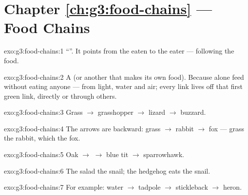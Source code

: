 \section*{Chapter \ref{ch:g3:food-chains} --- Food Chains}

\begin{solution}{exo:g3:food-chains:1}
``''. It points from the eaten to the eater ---
following the food.
\end{solution}

\begin{solution}{exo:g3:food-chains:2}
A  (or another  that makes its own food).
Because  alone feed without eating anyone --- from light,
water and air; every  link lives off that first green
link, directly or through others.
\end{solution}

\begin{solution}{exo:g3:food-chains:3}
Grass $\rightarrow$ grasshopper $\rightarrow$ lizard
$\rightarrow$ buzzard.
\end{solution}

\begin{solution}{exo:g3:food-chains:4}
The arrows are backward: grass $\rightarrow$ rabbit
$\rightarrow$ fox --- grass  the rabbit, which  the fox.
\end{solution}

\begin{solution}{exo:g3:food-chains:5}
Oak  $\rightarrow$  $\rightarrow$ blue tit
$\rightarrow$ sparrowhawk.
\end{solution}

\begin{solution}{exo:g3:food-chains:6}
The salad  the snail; the hedgehog eats the snail.
\end{solution}

\begin{solution}{exo:g3:food-chains:7}
For example: water  $\rightarrow$ tadpole $\rightarrow$
stickleback $\rightarrow$ heron.
\end{solution}

